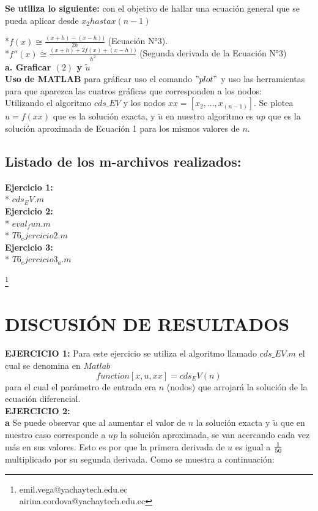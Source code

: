\documentclass[paper=a4, parskip=full, fontsize=12pt]{scrartcl} %
\numberwithin{equation}{section} %
\numberwithin{figure}{section} %
\numberwithin{table}{section} %
\begin{document}
	\textbf{Se utiliza lo siguiente:} con el objetivo de hallar una ecuaci\'on general que se pueda aplicar desde $x_2 hasta x(n-1)$
	
	*$f(x)\cong \frac{(x+h)-(x-h))}{2h}$ (Ecuaci\'on N°3).\\
	
	*$f''(x)\cong \frac{(x+h)+2f(x)+(x-h))}{h^2}$ (Segunda derivada de la Ecuaci\'on N°3)\\
	
		
\textbf{a. Graficar $(2)$  y $\tilde { u }$ }\\

	\textbf{Uso de MATLAB} para gr\'aficar uso el comando $"plot"$ y uso las herramientas para que aparezca las cuatros gr\'aficas que corresponden a los nodos:\\
		
Utilizando el algoritmo $cds\_EV$ y los nodos $xx=[x_2,...,x_(n-1)]$. Se plotea $u=f(xx)$ que es la soluci\'on exacta, y $\tilde { u }$ en nuestro algoritmo es $up$ que es la soluci\'on aproximada de Ecuaci\'on 1 para los mismos valores de $n$. \\ 
\subsection{Listado de los m-archivos realizados:}

\textbf{Ejercicio 1:}\\
* $cds_EV.m$\\
\textbf{Ejercicio 2:}\\
* $eval_fun.m$\\
* $T6_ejercicio2.m$\\
\textbf{Ejercicio 3:}\\
* $T6_ejercicio3_a.m$

	
\footnote{emil.vega@yachaytech.edu.ec\\airina.cordova@yachaytech.edu.ec}

\section{DISCUSI\'ON DE RESULTADOS}\label{sect_result}

\textbf{EJERCICIO 1:}
Para este ejercicio se utiliza el algoritmo llamado $cds\_EV.m$ el cual se denomina en $Matlab$\[function [x,u,xx]=cds_EV(n)\] para el cual el par\'ametro de entrada era $n$ (nodos) que arrojar\'a la soluci\'on de la ecuaci\'on diferencial.\\

\textbf{EJERCICIO 2:} \\
\textbf*{a} Se puede observar que al aumentar el valor de $n$ la soluci\'on exacta y $\tilde { u }$ que en nuestro caso corresponde a $up$ la solución aproximada, se van acercando cada vez m\'as en sus valores. Esto es por que la primera derivada de $u$ es igual a $\\ \frac { 1 }{ 50 } $ multiplicado por su segunda derivada. Como se muestra a continuaci\'on:
 
\end{document}
